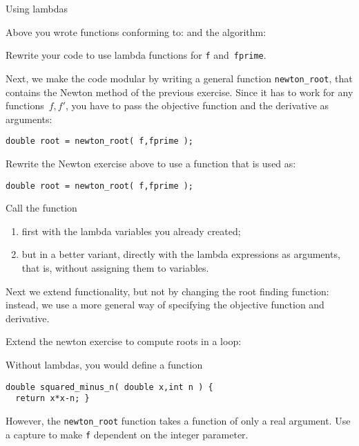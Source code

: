  {Using lambdas}

Above you wrote functions conforming to:
and the algorithm:

\begin{exercise}
  \label{ex:newton-functions}
  Rewrite your code to use lambda functions for \lstinline{f} and~\lstinline{fprime}.
\end{exercise}

Next, we make the code modular by 
writing a general function \lstinline+newton_root+,
that contains the Newton method of the previous exercise.
Since it has to work for any functions~$f,f'$,
you have to pass the objective function
and the derivative as arguments:
\begin{lstlisting}
double root = newton_root( f,fprime );
\end{lstlisting}

\begin{exercise}
  \label{ex:newton-function-ptr}
  Rewrite the Newton exercise above to use a function
  that is used as:
\begin{lstlisting}
double root = newton_root( f,fprime );
\end{lstlisting}
Call the function
\begin{enumerate}
  \item first with the lambda variables you already created; 
  \item but in a better variant, 
    directly with the lambda expressions as arguments,
    that is,  without assigning them to variables.
\end{enumerate}
\end{exercise}

Next we extend functionality, but not by changing the root finding function:
instead, we use a more general way of specifying the objective function
and derivative.

\begin{exercise}
  \label{ex:newton-capture-root}
  Extend the newton exercise to compute roots in a loop:

  Without lambdas, you would define a function
\begin{lstlisting}
double squared_minus_n( double x,int n ) {
  return x*x-n; }
\end{lstlisting}
However, the \lstinline{newton_root} function takes a function of only
a real argument.
Use a capture to make \lstinline{f} dependent on the integer parameter.
\end{exercise}

